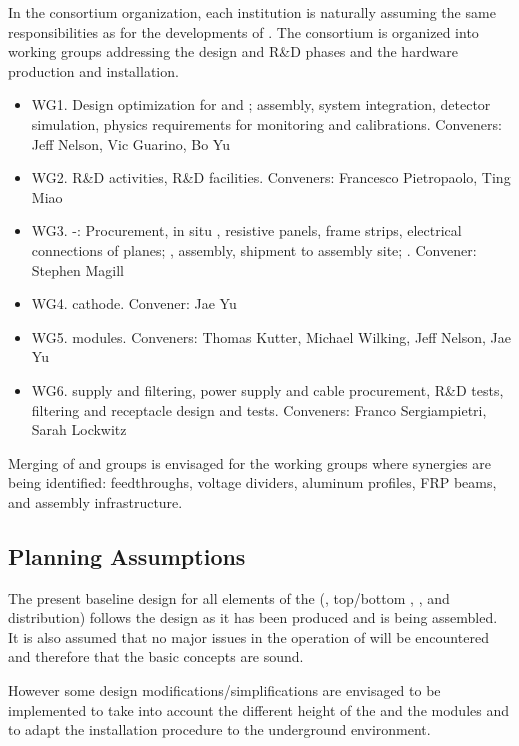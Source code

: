 In the  consortium organization, each institution is naturally assuming the same responsibilities as for the developments of . The consortium is organized into working groups addressing the design and  R\&D phases and the hardware production and installation.

\begin{itemize}
\item WG1. Design optimization for  and ; assembly, system integration, detector simulation, physics requirements for monitoring and calibrations. Conveners: Jeff Nelson, Vic Guarino, Bo Yu
\item WG2. R\&D activities, R\&D facilities. Conveners: Francesco Pietropaolo, Ting Miao
\item WG3. -: Procurement, in situ , resistive panels, frame strips, electrical connections of planes; , assembly, shipment to assembly site; . Convener: Stephen Magill
\item WG4.  cathode. Convener: Jae Yu
\item WG5.  modules. Conveners: Thomas Kutter, Michael Wilking, Jeff Nelson, Jae Yu
\item WG6.  supply and filtering,  power supply and cable procurement, R\&D tests, filtering and receptacle design and tests. Conveners: Franco Sergiampietri, Sarah Lockwitz
\end{itemize}

\noindent Merging of  and  groups is envisaged for the working groups where synergies are being identified:  feedthroughs, voltage dividers, aluminum profiles, FRP beams, and assembly infrastructure.

\subsection{Planning Assumptions}
\label{sec:fdsp-hv-org-assmp}
The present baseline design for all elements of the  (, top/bottom , ,  and  distribution) follows the  design as it has been produced and is being assembled.  It is also assumed that no major issues in the  operation of  will be encountered and therefore that the basic  concepts are sound.

However some design modifications/simplifications are envisaged to be implemented to take into account the different height of the   and the  modules and to adapt the installation procedure to the underground environment.


